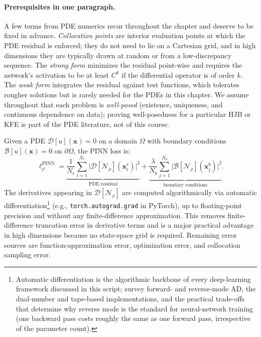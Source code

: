 \documentclass[11pt,a4paper]{report}
\newcommand{\x}{\bm{x}}
\begin{document}
\paragraph{Prerequisites in one paragraph.}  A few terms from PDE numerics recur throughout the chapter and deserve to be fixed in advance.  \emph{Collocation points} are interior evaluation points at which the PDE residual is enforced; they do not need to lie on a Cartesian grid, and in high dimensions they are typically drawn at random or from a low-discrepancy sequence.  The \emph{strong form} minimizes the residual point-wise and requires the network's activation to be at least $C^k$ if the differential operator is of order $k$.  The \emph{weak form} integrates the residual against test functions, which tolerates rougher solutions but is rarely needed for the PDEs in this chapter.  We assume throughout that each problem is \emph{well-posed} (existence, uniqueness, and continuous dependence on data); proving well-posedness for a particular HJB or KFE is part of the PDE literature, not of this course.

Given a PDE $\mathcal{D}[u](\x) = 0$ on a domain $\Omega$ with boundary conditions $\mathcal{B}[u](\x) = 0$ on $\partial\Omega$, the PINN loss is:
\begin{equation}
\boxed{
\ell_\rho^\mathrm{PINN} =
\underbrace{\frac{1}{N_r}\sum_{i=1}^{N_r} \big|\mathcal{D}[\mathcal{N}_\rho](\x_i^r)\big|^2}_{\text{PDE residual}}
+ \underbrace{\frac{\lambda}{N_b}\sum_{j=1}^{N_b} \big|\mathcal{B}[\mathcal{N}_\rho](\x_j^b)\big|^2}_{\text{boundary conditions}}.
}
\label{eq:pinn_loss}
\end{equation}
The derivatives appearing in $\mathcal{D}[\mathcal{N}_\rho]$ are computed algorithmically via automatic differentiation\footnote{Automatic differentiation is the algorithmic backbone of every deep-learning framework discussed in this script; \citet{baydin2018automatic} survey forward- and reverse-mode AD, the dual-number and tape-based implementations, and the practical trade-offs that determine why reverse mode is the standard for neural-network training (one backward pass costs roughly the same as one forward pass, irrespective of the parameter count).} (e.g., \texttt{torch.autograd.grad} in PyTorch), up to floating-point precision and without any finite-difference approximation.  This removes finite-difference truncation error in derivative terms and is a major practical advantage in high dimensions because no state-space grid is required.  Remaining error sources are function-approximation error, optimization error, and collocation sampling error.
\end{document}
